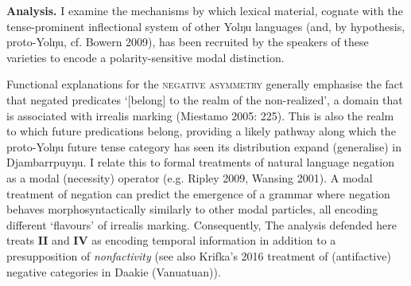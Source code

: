 \documentclass[dvipsnames,12pt]{article}%
\begin{document}
\noindent 

\noindent\textbf{Analysis.}  I examine the mechanisms by which lexical material, cognate with the tense-prominent inflectional system of other Yolŋu languages (and, by hypothesis, proto-Yolŋu, cf. Bowern 2009), has been recruited by the speakers of these varieties to encode a polarity-sensitive modal distinction. %

Functional explanations for the \textsc{negative asymmetry} generally emphasise the fact that negated predicates `[belong] to the realm of the non-realized', a domain that is associated with irrealis marking (Miestamo 2005: 225). This is also the realm to which future predications belong, providing a likely pathway along which the proto-Yolŋu future tense category has seen its distribution expand (generalise) in Djambarrpuyŋu. I relate this to formal treatments of natural language negation as a modal (necessity) operator (e.g. Ripley 2009, Wansing 2001). A modal treatment of negation can predict the emergence of a grammar where negation beh\-aves morphosyntactically similarly to other modal particles, all encoding different `flavours' of irrealis marking. Consequently, The analysis defended here treats \textbf{II} and \textbf{IV} as encoding temporal information in addition to a presupposition of \textit{nonfactivity} (see also Krifka's 2016 treatment of (antifactive) negative categories in Daakie (Vanuatuan)).
\end{document}
